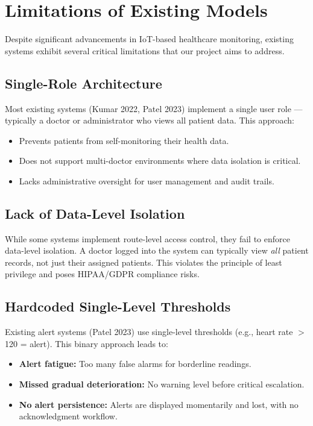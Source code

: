 \chapter{Limitations of Existing Models}

Despite significant advancements in IoT-based healthcare monitoring, existing systems exhibit several critical limitations that our project aims to address.

\section{Single-Role Architecture}
Most existing systems (Kumar 2022, Patel 2023) implement a single user role --- typically a doctor or administrator who views all patient data. This approach:
\begin{itemize}[leftmargin=*]
    \item Prevents patients from self-monitoring their health data.
    \item Does not support multi-doctor environments where data isolation is critical.
    \item Lacks administrative oversight for user management and audit trails.
\end{itemize}

\section{Lack of Data-Level Isolation}
While some systems implement route-level access control, they fail to enforce data-level isolation. A doctor logged into the system can typically view \textit{all} patient records, not just their assigned patients. This violates the principle of least privilege and poses HIPAA/GDPR compliance risks.

\section{Hardcoded Single-Level Thresholds}
Existing alert systems (Patel 2023) use single-level thresholds (e.g., heart rate $>$ 120 = alert). This binary approach leads to:
\begin{itemize}[leftmargin=*]
    \item \textbf{Alert fatigue:} Too many false alarms for borderline readings.
    \item \textbf{Missed gradual deterioration:} No warning level before critical escalation.
    \item \textbf{No alert persistence:} Alerts are displayed momentarily and lost, with no acknowledgment workflow.
\end{itemize}

